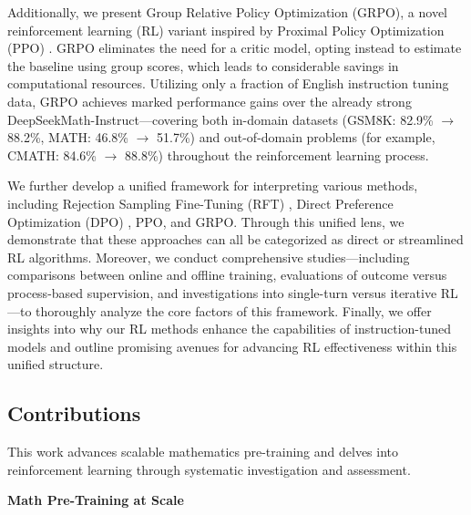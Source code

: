Additionally, we present Group Relative Policy Optimization (GRPO), a novel reinforcement learning (RL) variant inspired by Proximal Policy Optimization (PPO) \citep{schulman2017proximal}. GRPO eliminates the need for a critic model, opting instead to estimate the baseline using group scores, which leads to considerable savings in computational resources. Utilizing only a fraction of English instruction tuning data, GRPO achieves marked performance gains over the already strong DeepSeekMath-Instruct—covering both in-domain datasets (GSM8K: 82.9\% $\rightarrow$ 88.2\%, MATH: 46.8\% $\rightarrow$ 51.7\%) and out-of-domain problems (for example, CMATH: 84.6\% $\rightarrow$ 88.8\%) throughout the reinforcement learning process. 

We further develop a unified framework for interpreting various methods, including Rejection Sampling Fine-Tuning (RFT) \citep{yuan2023scaling}, Direct Preference Optimization (DPO) \citep{dpo}, PPO, and GRPO. Through this unified lens, we demonstrate that these approaches can all be categorized as direct or streamlined RL algorithms. Moreover, we conduct comprehensive studies—including comparisons between online and offline training, evaluations of outcome versus process-based supervision, and investigations into single-turn versus iterative RL—to thoroughly analyze the core factors of this framework. Finally, we offer insights into why our RL methods enhance the capabilities of instruction-tuned models and outline promising avenues for advancing RL effectiveness within this unified structure.

\subsection{Contributions}
This work advances scalable mathematics pre-training and delves into reinforcement learning through systematic investigation and assessment.

\textbf{Math Pre-Training at Scale}

